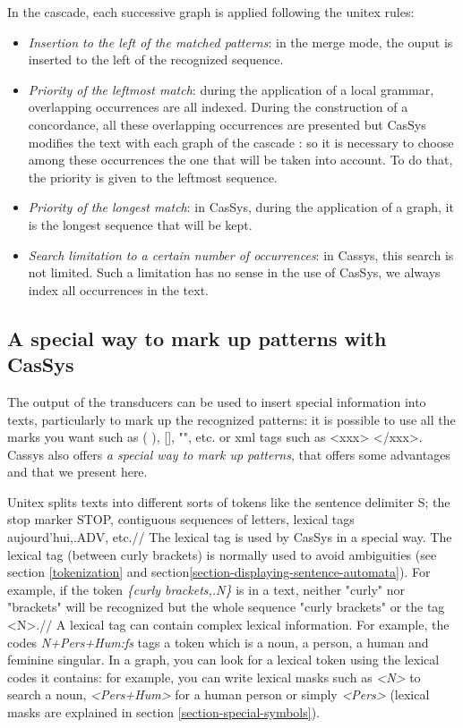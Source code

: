 In the cascade, each successive graph is applied following the unitex rules:
\begin{itemize}
	\item \textit{Insertion to the left of the matched patterns}: in the merge mode, the ouput is inserted to the left of the recognized sequence.
	\item	\textit{Priority of the leftmost match}: during the application of a local grammar, overlapping occurrences are all indexed. 
	During the construction of a concordance, all these overlapping occurrences are presented but CasSys modifies the text with each 
	graph of the cascade : so it is necessary to choose among these occurrences the one that will be taken into account. To do that, the priority is given to the leftmost sequence.
	\item \textit{Priority of the longest match}: in CasSys, during the application of a graph, it is the longest sequence 
	that will be kept.
	\item	\textit{Search limitation to a certain number of occurrences}: in Cassys, this search is not limited. Such a limitation has no sense in the use of CasSys, we always index all occurrences in the text.
\end{itemize}

\subsection{A special way to mark up patterns with CasSys}

The output of the transducers can be used to insert special information into texts, particularly to mark up the recognized patterns: it is 
possible to use all the marks you want such as ( ), [], "", etc. or xml tags such as <xxx> </xxx>.\\
Cassys also offers\textit{ a special way to mark up patterns}, that offers some advantages and that we present here.  

\bigskip
\noindent Unitex splits texts into different sorts of tokens like the sentence delimiter {S}; the stop marker {STOP}, contiguous 
sequences of letters, lexical tags {aujourd'hui,.ADV}, etc.//
The lexical tag is used by CasSys in a special way. The lexical tag (between curly brackets) is normally used to avoid ambiguities (see section \ref{tokenization} and section\ref{section-displaying-sentence-automata}). 
For example, if the token \emph{\{curly brackets,.N\}} is in a text, neither "curly" nor "brackets" will be recognized but the whole sequence 
"curly brackets" or the tag <N>.// 
A lexical tag can contain complex lexical information. For example, the codes \emph{N+Pers+Hum:fs} tags a token which is a noun, a person, a human and feminine singular. In a graph, you can look for a lexical token using the lexical codes it contains: for example, you can write lexical masks such as \emph{<N>} to search a noun, \emph{<Pers+Hum>} for a human person or simply \emph{<Pers>} (lexical masks are explained in section \ref{section-special-symbols}).
 
